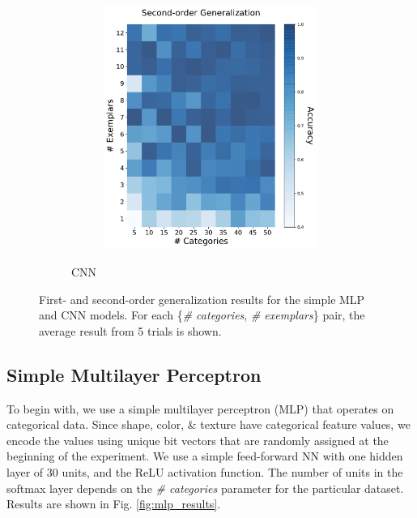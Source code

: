\begin{figure}[h]
\begin{center}
\begin{subfigure}[b]{0.47\textwidth}
\begin{center}
\begin{subfigure}[b]{0.48\textwidth}
\begin{center}
                        \includegraphics[width=\textwidth]{figures/cnn_2order_accuracy.pdf}
                    \end{center}
                \end{subfigure}
            \end{center}
            \caption{CNN}
            \label{fig:cnn_results}
        \end{subfigure}
    \end{center}
    \caption{First- and second-order generalization results for the simple MLP and CNN models.
    For each \{\textit{\# categories}, \textit{\# exemplars}\} pair, the average result from
    5 trials is shown.}
    \label{fig:generalization_results}
\end{figure}

\subsection{Simple Multilayer Perceptron}
To begin with, we use a simple multilayer perceptron (MLP) that operates on categorical
data. Since shape, color, \& texture have categorical feature values, we encode the values
using unique bit vectors that are randomly assigned at the beginning of the experiment. We
use a simple feed-forward NN with one hidden layer of 30 units, and the ReLU activation
function. The number of units in the softmax layer depends on the \textit{\# categories}
parameter for the particular dataset. Results are shown in Fig. \ref{fig:mlp_results}.

